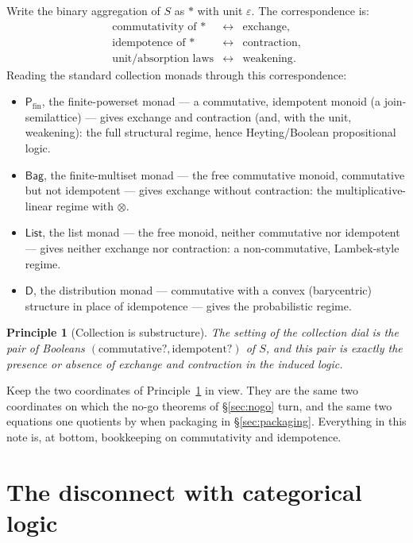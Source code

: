 \documentclass[11pt]{article}
\theoremstyle{definition}
\theoremstyle{plain}
\newtheorem{principle}[definition]{Principle}
\newcommand{\Coll}{S}
\newcommand{\List}{\mathsf{List}}
\newcommand{\Mset}{\mathsf{Bag}}
\newcommand{\Pfin}{\mathsf{P}_{\mathrm{fin}}}
\newcommand{\Dist}{\mathsf{D}}
\begin{document}
Write the binary aggregation of $\Coll$ as $\ast$ with unit $\varepsilon$.
The correspondence is:
\[
\begin{array}{lll}
  \text{commutativity of } \ast & \longleftrightarrow & \text{exchange},\\[2pt]
  \text{idempotence of } \ast    & \longleftrightarrow & \text{contraction},\\[2pt]
  \text{unit/absorption laws}    & \longleftrightarrow & \text{weakening}.
\end{array}
\]
Reading the standard collection monads through this correspondence:
\begin{itemize}[leftmargin=1.4em]
\item $\Pfin$, the finite-powerset monad --- a commutative, idempotent monoid
      (a join-semilattice) --- gives exchange and contraction (and, with the
      unit, weakening): the full structural regime, hence Heyting/Boolean
      propositional logic.
\item $\Mset$, the finite-multiset monad --- the free commutative monoid,
      commutative but not idempotent --- gives exchange without contraction:
      the multiplicative-linear regime with $\otimes$.
\item $\List$, the list monad --- the free monoid, neither commutative nor
      idempotent --- gives neither exchange nor contraction: a
      non-commutative, Lambek-style regime.
\item $\Dist$, the distribution monad --- commutative with a convex (barycentric)
      structure in place of idempotence --- gives the probabilistic regime.
\end{itemize}

\begin{principle}[Collection is substructure]
\label{prin:dial}
The setting of the collection dial is the pair of Booleans
$(\text{commutative?}, \text{idempotent?})$ of $\Coll$, and this pair is
exactly the presence or absence of exchange and contraction in the induced
logic.
\end{principle}

Keep the two coordinates of Principle~\ref{prin:dial} in view. They are the
same two coordinates on which the no-go theorems of \S\ref{sec:nogo} turn,
and the same two equations one quotients by when packaging in
\S\ref{sec:packaging}. Everything in this note is, at bottom, bookkeeping on
commutativity and idempotence.

\section{The disconnect with categorical logic}
\label{sec:disconnect}
\end{document}
